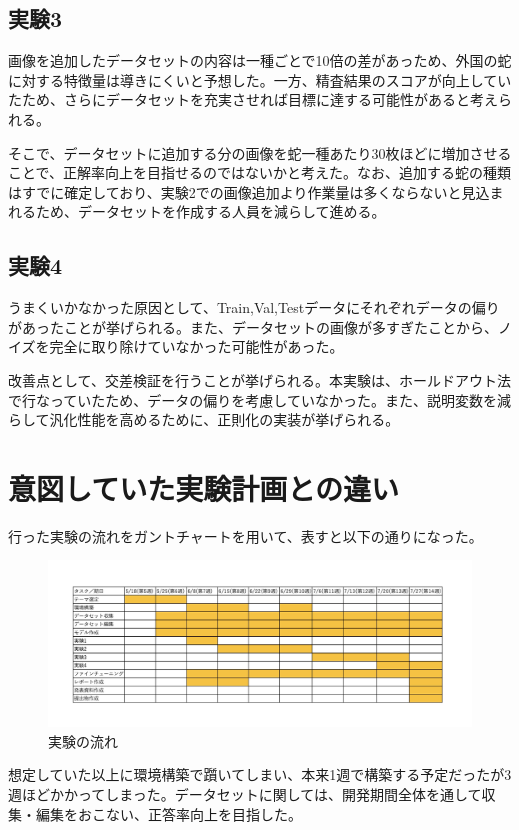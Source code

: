 \documentclass[a4paper, 11pt, titlepage]{jsarticle}
\begin{document}
\subsection{実験3}
画像を追加したデータセットの内容は一種ごとで10倍の差があっため、外国の蛇に対する特徴量は導きにくいと予想した。一方、精査結果のスコアが向上していたため、さらにデータセットを充実させれば目標に達する可能性があると考えられる。\par
そこで、データセットに追加する分の画像を蛇一種あたり30枚ほどに増加させることで、正解率向上を目指せるのではないかと考えた。なお、追加する蛇の種類はすでに確定しており、実験2での画像追加より作業量は多くならないと見込まれるため、データセットを作成する人員を減らして進める。

\subsection{実験4}
うまくいかなかった原因として、Train,Val,Testデータにそれぞれデータの偏りがあったことが挙げられる。また、データセットの画像が多すぎたことから、ノイズを完全に取り除けていなかった可能性があった。\par
改善点として、交差検証を行うことが挙げられる。本実験は、ホールドアウト法で行なっていたため、データの偏りを考慮していなかった。また、説明変数を減らして汎化性能を高めるために、正則化の実装が挙げられる。\cite{theme4}

\clearpage

\section{意図していた実験計画との違い}
行った実験の流れをガントチャートを用いて、表すと以下の通りになった。\par
\begin{figure}[htbp]
\begin{center}
\includegraphics[width=150mm]{G2_Ganttchart.jpeg}
\caption{実験の流れ}
\end{center}
\end{figure}
想定していた以上に環境構築で躓いてしまい、本来1週で構築する予定だったが3週ほどかかってしまった。データセットに関しては、開発期間全体を通して収集・編集をおこない、正答率向上を目指した。
\end{document}

